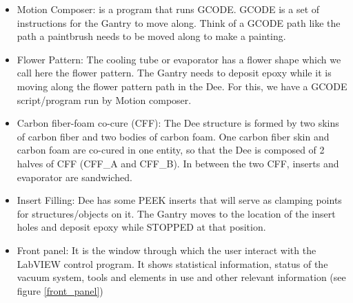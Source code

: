 \documentclass[12pt]{cornelltfpxsop}
\begin{document}
\begin{itemize}
    \item Motion Composer: is a program that runs GCODE. GCODE is a set of instructions for the Gantry to move along. Think of a GCODE path like the path a paintbrush needs to be moved along to make a painting.
    \item Flower Pattern: The cooling tube or evaporator has a flower shape which we call here the flower pattern. The Gantry needs to deposit epoxy while it is moving along the flower pattern path in the Dee. For this, we have a GCODE script/program run by Motion composer.
    \item Carbon fiber-foam co-cure (CFF): The Dee structure is formed by two skins of carbon fiber and two bodies of carbon foam. One carbon fiber skin and carbon foam are co-cured in one entity, so that the Dee is composed of 2 halves of CFF (CFF\_A and CFF\_B). In between the two CFF, inserts and evaporator are sandwiched.    
    \item Insert Filling: Dee has some PEEK inserts that will serve as clamping points for structures/objects on it. The Gantry moves to the location of the insert holes and deposit epoxy while STOPPED at that position. 
    \item Front panel: It is the window through which the user interact with the LabVIEW control program. It shows statistical information, status of the vacuum system, tools and elements in use and other relevant information (see figure \ref{front_panel})
\end{itemize}


\end{document}
